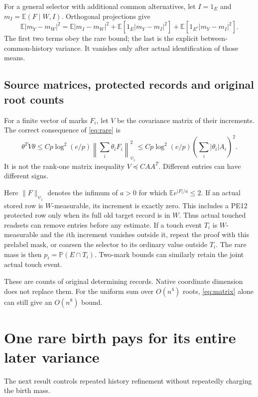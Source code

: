 \documentclass[11pt,letterpaper]{article}
\theoremstyle{remark}\newtheorem{remark}[theorem]{Remark}
\newcommand{\E}{\mathbb E}
\newcommand{\norm}[1]{\left\lVert#1\right\rVert}
\begin{document}
For a general selector with additional common alternatives, let \(I=1_E\) and \(m_I=\E(F\mid W,I)\). Orthogonal projections give
\begin{equation}\label{eq:common}
 \E|m_Y-m_W|^2
 =\E|m_I-m_W|^2+\E[1_E|m_Y-m_I|^2]
 +\E[1_{E^c}|m_Y-m_I|^2].
\end{equation}
The first two terms obey the rare bound; the last is the explicit between-common-history variance. It vanishes only after actual identification of those means.

\subsection{Source matrices, protected records and original root counts}

For a finite vector of marks \(F_i\), let \(V\) be the covariance matrix of their increments. The correct consequence of \eqref{eq:rare} is
\begin{equation}\label{eq:matrix}
 \theta^TV\theta
 \le Cp\log^2(e/p)
 \norm{\sum_i\theta_i F_i}_{\psi_1}^2
 \le Cp\log^2(e/p)\left(\sum_i|\theta_i|A_i\right)^2.
\end{equation}
It is not the rank-one matrix inequality \(V\preceq CAA^T\). Different entries can have different signs.

Here \(\|F\|_{\psi_1}\) denotes the infimum of \(a>0\) for which \(\E e^{|F|/a}\le2\). If an actual stored row is \(W\)-measurable, its increment is exactly zero. This includes a PE12 protected row only when its full old target record is in \(W\). Thus actual touched readsets can remove entries before any estimate. If a touch event \(T_i\) is \(W\)-measurable and the \(i\)th increment vanishes outside it, repeat the proof with this prelabel mask, or coarsen the selector to its ordinary value outside \(T_i\). The rare mass is then \(p_i=\mathbb P(E\cap T_i)\). Two-mark bounds can similarly retain the joint actual touch event.

These are counts of original determining records. Native coordinate dimension does not replace them. For the uniform sum over \(O(n^4)\) roots, \eqref{eq:matrix} alone can still give an \(O(n^8)\) bound.

\section{One rare birth pays for its entire later variance}

The next result controls repeated history refinement without repeatedly charging the birth mass.
\end{document}
